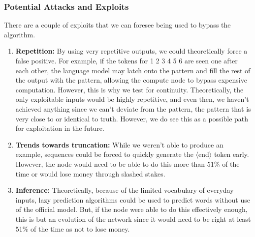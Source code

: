 \documentclass{article}
\begin{document}
\subsubsection*{Potential Attacks and Exploits}

There are a couple of exploits that we can foresee being used to bypass the algorithm.

\begin{enumerate}
    \item \textbf{Repetition:} By using very repetitive outputs, we could theoretically force a false positive. 
    For example, if the tokens for 1 2 3 4 5 6 are seen one after each other, the language model may latch onto the pattern and fill the rest of the output with the pattern, allowing the compute node to bypass expensive computation. 
    However, this is why we test for continuity. 
    Theoretically, the only exploitable inputs would be highly repetitive, and even then, we haven't achieved anything since we can't deviate from the pattern, the pattern that is very close to or identical to truth. 
    However, we do see this as a possible path for exploitation in the future.
    \item \textbf{Trends towards truncation:} While we weren't able to produce an example, sequences could be forced to quickly generate the $\langle$end$\rangle$ token early. 
    However, the node would need to be able to do this more than 51\% of the time or would lose money through slashed stakes.
    \item \textbf{Inference:} Theoretically, because of the limited vocabulary of everyday inputs, lazy prediction algorithms could be used to predict words without use of the official model.
     But, if the node were able to do this effectively enough, this is but an evolution of the network since it would need to be right at least 51\% of the time as not to lose money.
\end{enumerate}
\end{document}
